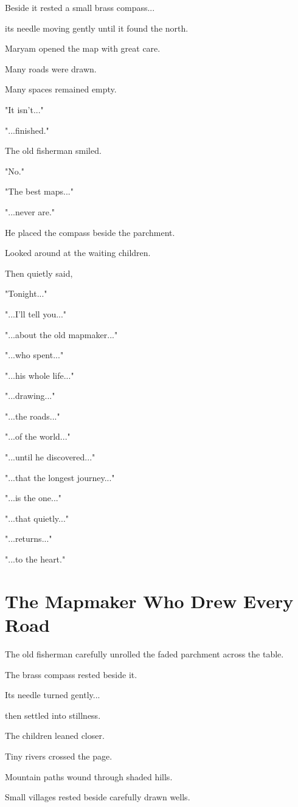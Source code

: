\documentclass[12pt,openany]{book}
\begin{document}
Beside it rested a small brass compass...

its needle moving gently until it found the north.

Maryam opened the map with great care.

Many roads were drawn.

Many spaces remained empty.

"It isn't..."

"...finished."

The old fisherman smiled.

"No."

"The best maps..."

"...never are."

He placed the compass beside the parchment.

Looked around at the waiting children.

Then quietly said,

"Tonight..."

"...I'll tell you..."

"...about the old mapmaker..."

"...who spent..."

"...his whole life..."

"...drawing..."

"...the roads..."

"...of the world..."

"...until he discovered..."

"...that the longest journey..."

"...is the one..."

"...that quietly..."

"...returns..."

"...to the heart."
\section*{The Mapmaker Who Drew Every Road}

The old fisherman carefully unrolled the faded parchment across the table.

The brass compass rested beside it.

Its needle turned gently...

then settled into stillness.

The children leaned closer.

Tiny rivers crossed the page.

Mountain paths wound through shaded hills.

Small villages rested beside carefully drawn wells.
\end{document}
